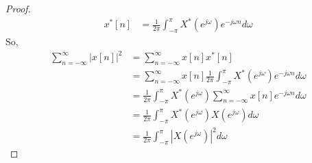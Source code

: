 \documentclass{home_assignment}
\begin{document}
{\begin{proof}
\begin{equation*}
\begin{aligned}
                            x^*[n]&=\frac{1}{2\pi}\int_{-\pi}^{\pi}X^*(e^{j\omega})e^{-j\omega n} d\omega
                        \end{aligned}
                        \end{equation*}
                So,
                \begin{equation*}
                    \begin{aligned} 
                        \sum_{n=-\infty}^{\infty} |x[n]|^2&=\sum_{n=-\infty}^{\infty} x[n]x^*[n]\\
                        &=\sum_{n=-\infty}^{\infty} x[n] \frac{1}{2\pi}\int_{-\pi}^{\pi}X^*(e^{j\omega})e^{-j\omega n} d\omega\\
                        &=\frac{1}{2\pi}\int_{-\pi}^{\pi}X^*(e^{j\omega})\sum_{n=-\infty}^{\infty} x[n]e^{-j\omega n} d\omega\\
                        &=\frac{1}{2\pi}\int_{-\pi}^{\pi}X^*(e^{j\omega})X(e^{j\omega})d\omega\\
                        &=\frac{1}{2\pi}\int_{-\pi}^{\pi}|X(e^{j\omega})|^2 d\omega
                    \end{aligned}
                    \end{equation*}
                \end{proof}
}
\end{document}
